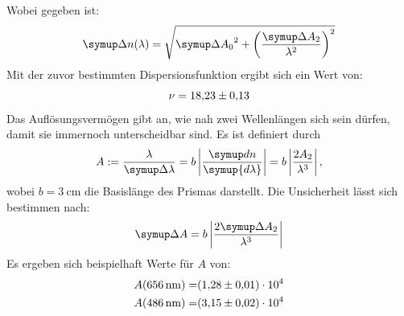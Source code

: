 Wobei gegeben ist:
\begin{equation}
	\symup\Delta n(\lambda) = \sqrt{{\symup\Delta A_0}^2 + \left(\frac{\symup\Delta A_2}{\lambda^2}\right)^2}
\end{equation}
Mit der zuvor bestimmten Dispersionsfunktion ergibt sich ein Wert von:
\begin{equation}
	\nu = \num{18.23\pm0.13}
\end{equation}
Das Auflösungsvermögen gibt an, wie nah zwei Wellenlängen sich sein dürfen, damit sie immernoch unterscheidbar sind.
Es ist definiert durch
\begin{equation}
	A := \frac{\lambda}{\symup\Delta\lambda} = b\left\lvert\frac{\symup dn}{\symup{d\lambda}}\right\rvert = b\left\lvert\frac{2A_2}{\lambda^3}\right\rvert,
\end{equation}
wobei $b=\SI{3}{\centi\meter}$\cite{v402} die Basislänge des Prismas darstellt.
Die Unsicherheit lässt sich bestimmen nach:
\begin{equation}
	\symup\Delta A = b\left\lvert\frac{2\symup\Delta A_2}{\lambda^3}\right\rvert
\end{equation}
Es ergeben sich beispielhaft Werte für $A$ von:
\begin{align}
	A(\SI{656}{\nano\meter}) =& \num{1.28\pm0.01e4} \\ 
	A(\SI{486}{\nano\meter}) =& \num{3.15\pm0.02e4} 
\end{align}
